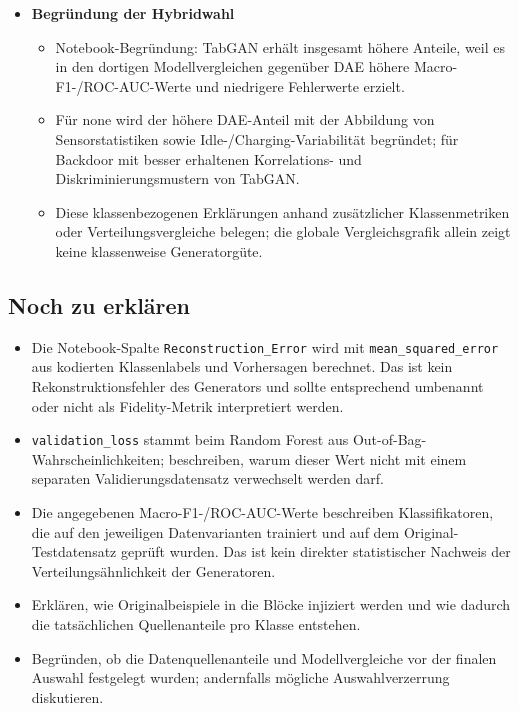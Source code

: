 \begin{itemize}
\begin{itemize}
          100\,000 Zeilen pro Knoten (acht Knoten).
  \end{itemize}
  \item \textbf{Begründung der Hybridwahl}
  \begin{itemize}
    \item Notebook-Begründung: TabGAN erhält insgesamt höhere Anteile,
          weil es in den dortigen Modellvergleichen gegenüber DAE höhere
          Macro-F1-/ROC-AUC-Werte und niedrigere Fehlerwerte erzielt.
    \item Für none wird der höhere DAE-Anteil mit der Abbildung von
          Sensorstatistiken sowie Idle-/Charging-Variabilität begründet;
          für Backdoor mit besser erhaltenen Korrelations- und
          Diskriminierungsmustern von TabGAN.
    \item Diese klassenbezogenen Erklärungen anhand zusätzlicher
          Klassenmetriken oder Verteilungsvergleiche belegen; die globale
          Vergleichsgrafik allein zeigt keine klassenweise Generatorgüte.
  \end{itemize}
\end{itemize}

\subsection{Noch zu erklären}
\begin{itemize}
  \item Die Notebook-Spalte \texttt{Reconstruction\_Error} wird mit
        \texttt{mean\_squared\_error} aus kodierten Klassenlabels und
        Vorhersagen berechnet. Das ist kein Rekonstruktionsfehler des
        Generators und sollte entsprechend umbenannt oder nicht als
        Fidelity-Metrik interpretiert werden.
  \item \texttt{validation\_loss} stammt beim Random Forest aus
        Out-of-Bag-Wahrscheinlichkeiten; beschreiben, warum dieser Wert
        nicht mit einem separaten Validierungsdatensatz verwechselt werden darf.
  \item Die angegebenen Macro-F1-/ROC-AUC-Werte beschreiben Klassifikatoren,
        die auf den jeweiligen Datenvarianten trainiert und auf dem
        Original-Testdatensatz geprüft wurden. Das ist kein direkter
        statistischer Nachweis der Verteilungsähnlichkeit der Generatoren.
  \item Erklären, wie Originalbeispiele in die Blöcke injiziert werden und
        wie dadurch die tatsächlichen Quellenanteile pro Klasse entstehen.
  \item Begründen, ob die Datenquellenanteile und Modellvergleiche vor der
        finalen Auswahl festgelegt wurden; andernfalls mögliche
        Auswahlverzerrung diskutieren.
\end{itemize}

